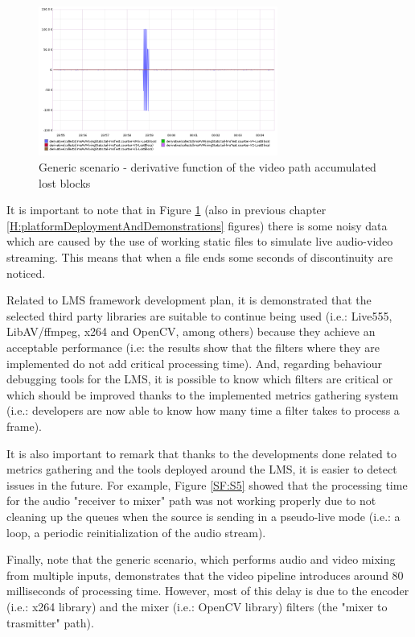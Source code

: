 \begin{figure}[!htb]
\begin{center}
\includegraphics[width=0.70\textwidth]{./images/testAVMix/AVMixVideoLostBlocsDerivative.png}
\caption{Generic scenario - derivative function of the video path accumulated lost blocks}
\label{F:gsvpalbd}
\end{center}
\end{figure}

It is important to note that in Figure \ref{F:gsvpalbd} (also in previous chapter \ref{H:platformDeploymentAndDemonstrations} figures) there is some noisy data which are caused by the use of working static files to simulate live audio-video streaming. This means that when a file ends some seconds of discontinuity are noticed.

Related to LMS framework development plan, it is demonstrated that the selected third party libraries are suitable to continue being used (i.e.: Live555, LibAV/ffmpeg, x264 and OpenCV, among others) because they achieve an acceptable performance (i.e: the results show that the filters where they are implemented do not add critical processing time). And, regarding behaviour debugging tools for the LMS, it is possible to know which filters are critical or which should be improved thanks to the implemented metrics gathering system (i.e.: developers are now able to know how many time a filter takes to process a frame).

It is also important to remark that thanks to the developments done related to metrics gathering and the tools deployed around the LMS, it is easier to detect issues in the future. For example, Figure \ref{SF:S5} showed that the processing time for the audio "receiver to mixer" path was not working properly due to not cleaning up the queues when the source is sending in a pseudo-live mode (i.e.: a loop, a periodic reinitialization of the audio stream).

Finally, note that the generic scenario, which performs audio and video mixing from multiple inputs, demonstrates that the video pipeline introduces around 80 milliseconds of processing time. However, most of this delay is due to the encoder (i.e.: x264 library) and the mixer (i.e.: OpenCV library) filters (the "mixer to trasmitter" path).

